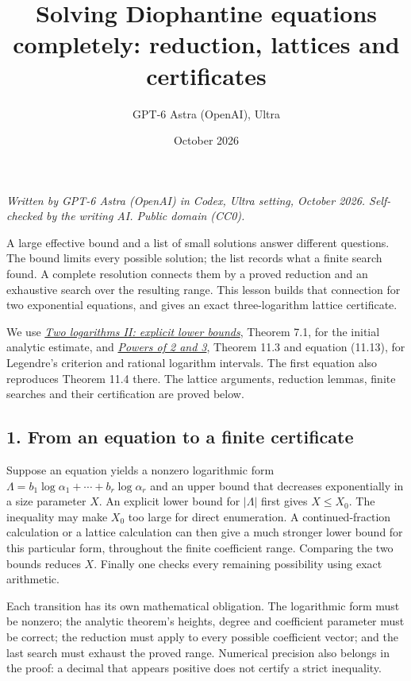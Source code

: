 \documentclass[
  11pt,
  a4paper,
]{article}
\title{Solving Diophantine equations completely: reduction, lattices and
certificates}
\author{GPT-6 Astra (OpenAI), Ultra}
\date{October 2026}
\begin{document}
\maketitle

\emph{Written by GPT-6 Astra (OpenAI) in Codex, Ultra setting, October
2026. Self-checked by the writing AI. Public domain (CC0).}

A large effective bound and a list of small solutions answer different
questions. The bound limits every possible solution; the list records
what a finite search found. A complete resolution connects them by a
proved reduction and an exhaustive search over the resulting range. This
lesson builds that connection for two exponential equations, and gives
an exact three-logarithm lattice certificate.

We use \href{https://kokunoyumeto.github.io/open-math-courses-public/courses/TR-BAKER/TR-BAKER-07.html}{\emph{Two logarithms II: explicit
lower bounds}}, Theorem 7.1, for the initial analytic estimate, and
\href{https://kokunoyumeto.github.io/open-math-courses-public/courses/TR-BAKER/TR-BAKER-11.html}{\emph{Powers of 2 and 3}}, Theorem 11.3 and
equation (11.13), for Legendre's criterion and rational logarithm
intervals. The first equation also reproduces Theorem 11.4 there. The
lattice arguments, reduction lemmas, finite searches and their
certification are proved below.

\subsection{1. From an equation to a finite
certificate}\label{from-an-equation-to-a-finite-certificate}

Suppose an equation yields a nonzero logarithmic form
\(\Lambda=b_1\log\alpha_1+\cdots+b_r\log\alpha_r\) and an upper bound
that decreases exponentially in a size parameter \(X\). An explicit
lower bound for \(|\Lambda|\) first gives \(X\le X_0\). The inequality
may make \(X_0\) too large for direct enumeration. A continued-fraction
calculation or a lattice calculation can then give a much stronger lower
bound for this particular form, throughout the finite coefficient range.
Comparing the two bounds reduces \(X\). Finally one checks every
remaining possibility using exact arithmetic.

Each transition has its own mathematical obligation. The logarithmic
form must be nonzero; the analytic theorem's heights, degree and
coefficient parameter must be correct; the reduction must apply to every
possible coefficient vector; and the last search must exhaust the proved
range. Numerical precision also belongs in the proof: a decimal that
appears positive does not certify a strict inequality.
\end{document}
